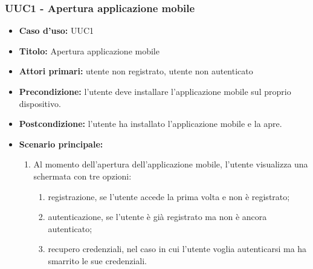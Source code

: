 \documentclass[casi-duso]{subfiles}
\begin{document}
\subsubsection{UUC1 - Apertura applicazione mobile}
\label{subsub:UUC1utente}
\begin{itemize}
  \item \textbf{Caso d’uso:} UUC1 
  \item \textbf{Titolo:} Apertura applicazione mobile
  \item \textbf{Attori primari:} utente non registrato, utente non autenticato
  \item \textbf{Precondizione:} l'utente deve installare l'applicazione mobile sul proprio dispositivo.
  \item \textbf{Postcondizione:} l'utente ha installato l'applicazione mobile e la apre.
  \item \textbf{Scenario principale:} 
  \begin{enumerate}
    \item Al momento dell'apertura dell'applicazione mobile, l'utente visualizza una schermata con tre opzioni:
    \begin{enumerate}
      \item registrazione, se l'utente accede la prima volta e non è registrato;
      \item autenticazione, se l'utente è già registrato ma non è ancora autenticato;
      \item recupero credenziali, nel caso in cui l'utente voglia autenticarsi ma ha smarrito le sue credenziali.
    \end{enumerate}
  \end{enumerate}   
\end{itemize}

\end{document}
